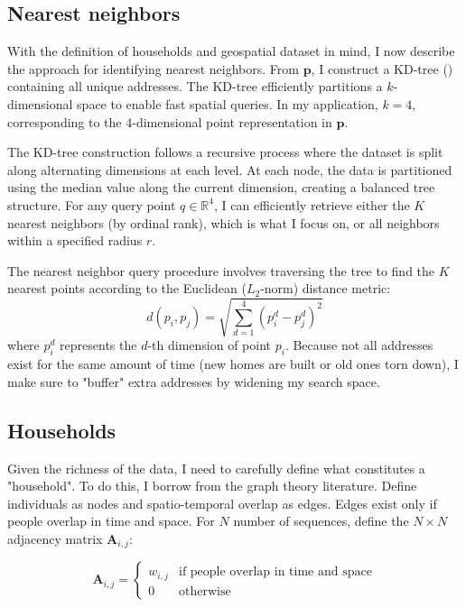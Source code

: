 \documentclass[main.tex]{subfiles}
\begin{document}
\subsection{Nearest neighbors}
With the definition of households and geospatial dataset in mind, I now describe the approach for identifying nearest neighbors. From $\mathbf{p}$, I construct a KD-tree (\textcite{bentley1975multidimensional}) containing all unique addresses. The KD-tree efficiently partitions a $k$-dimensional space to enable fast spatial queries. In my application, $k=4$, corresponding to the 4-dimensional point representation in $\mathbf{p}$.

The KD-tree construction follows a recursive process where the dataset is split along alternating dimensions at each level. At each node, the data is partitioned using the median value along the current dimension, creating a balanced tree structure.
For any query point $q \in \mathbb{R}^4$, I can efficiently retrieve either the $K$ nearest neighbors (by ordinal rank), which is what I focus on, or all neighbors within a specified radius $r$. 

The nearest neighbor query procedure involves traversing the tree to find the $K$ nearest points according to the Euclidean ($L_2$-norm) distance metric:
\begin{equation}
d(p_i, p_j) = \sqrt{\sum_{d=1}^{4} (p_i^d - p_j^d)^2}
\end{equation}
where $p_i^d$ represents the $d$-th dimension of point $p_i$. Because not all addresses exist for the same amount of time (new homes are built or old ones torn down), I make sure to "buffer" extra addresses by widening my search space. 


\subsection{Households}
Given the richness of the data, I need to carefully define what constitutes a "household". To do this, I borrow from the graph theory literature. Define individuals as nodes and spatio-temporal overlap as edges. Edges exist only if people overlap in time and space. For $N$ number of sequences, define the $N \times N$ adjacency matrix $\mathbf{A}_{i,j}$:

\begin{equation}
    \mathbf{A}_{i,j} = \begin{cases}
        w_{i,j} & \text{if people overlap in time and space} \\
        0 & \text{otherwise}
    \end{cases}
\end{equation}
\end{document}

